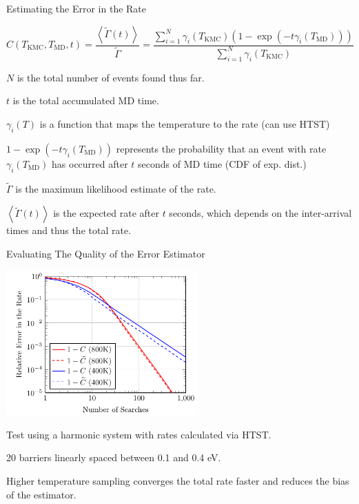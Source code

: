 \documentclass[onlymath]{beamer}
\begin{document}
\begin{frame}{Estimating the Error in the Rate}

\[
	C(T_\mathrm{KMC},T_\mathrm{MD},t) = \frac{\left< \widetilde{\Gamma}(t) \right>}{\widetilde{\Gamma}} =
	\frac{\sum_{i=1}^N   \gamma_i(T_\mathrm{KMC}) (1 - \exp(-t \gamma_i(T_\mathrm{MD})))}{\sum_{i=1}^N \gamma_i(T_\mathrm{KMC})}
\]

\vspace{2mm}

$N$ is the total number of events found thus far.

\vspace{2mm}

$t$ is the total accumulated MD time.

\vspace{2mm}

$\gamma_i(T)$ is a function that maps the temperature to the rate (can use HTST)

\vspace{2mm}

$1 - \exp(-t \gamma_i(T_\mathrm{MD}))$ represents the probability that an event with rate $\gamma_i(T_\mathrm{MD})$ has occurred after $t$ seconds of MD time (CDF of exp. dist.)

\vspace{2mm}

$\widetilde{\Gamma}$ is the maximum likelihood estimate of the rate.

\vspace{2mm}

$\left< \widetilde{\Gamma}(t)\right>$ is the expected rate after $t$ seconds, 
which depends on the inter-arrival times and thus the total rate.

\end{frame}

\begin{frame}{Evaluating The Quality of the Error Estimator}

\begin{center}
\includegraphics[width=0.55\textwidth]{images/confidence-test.pdf}
\end{center}

Test using a harmonic system with rates calculated via HTST.

20 barriers linearly spaced between 0.1 and 0.4 eV.

Higher temperature sampling converges the total rate faster and reduces the bias of the estimator.

\end{frame}
\end{document}
